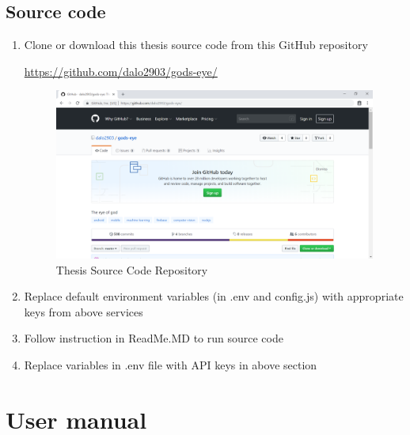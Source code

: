 \section{Source code}
\begin{enumerate}
\item Clone or download this thesis source code from this GitHub repository 

\href{https://github.com/dalo2903/gods-eye/}{https://github.com/dalo2903/gods-eye/}
\begin{center}
    \begin{figure}[H]
    \centering
    \includegraphics[width=1\columnwidth]{images/appendixA/GodsEye-GitHub.PNG}
    \caption{Thesis Source Code Repository}
    \end{figure}
\end{center}
\item Replace default environment variables (in .env and config.js) with appropriate keys from above services
\item Follow instruction in ReadMe.MD to run source code
\item Replace variables in .env file with API keys in above section
\end{enumerate}

\chapter{User manual}
